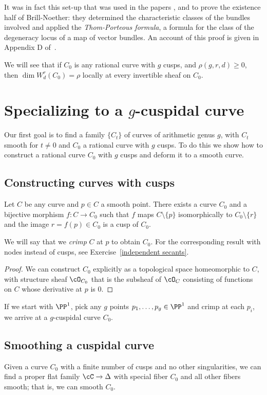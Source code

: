 It was in fact this set-up that was used in the papers \cite{MR323792}, \cite{MR0357398} and \cite{Kempf} to prove the existence half of Brill-Noether: they determined the characteristic classes of the bundles involved and applied the \emph{Thom-Porteous formula}, a formula for the class of the degeneracy locus of a map of vector bundles. An account of this proof is given in Appendix D of~\cite{3264}.

 We will see that if $C_{0}$ is any rational curve
 with $g$ cusps, and $\rho(g,r,d)\geq 0$, then $\dim W^r_d(C_0) = \rho$ locally at every invertible sheaf
 on $C_{0}$.


\section{Specializing to a $g$-cuspidal curve}

Our first goal is to find a family $\{C_t\}$ of curves of arithmetic genus $g$, with $C_t$ smooth for $t \neq 0$ and $C_0$ a rational curve with $g$ cusps. To do this we show how to construct a rational curve $C_0$ with $g$ cusps and deform it to a smooth curve.

\subsection{Constructing curves with cusps}

\begin{proposition}
Let $C$ be any curve and $p \in C$ a smooth point. There exists a curve $C_0$ and a bijective morphism $f : C \to C_0$ such that  $f$ maps $C \setminus \{p\}$ isomorphically to $C_0 \setminus \{r\}$ and the image $r=f(p) \in C_0$ is a cusp of $C_0$.
\end{proposition}

We will say that we \emph{crimp} $C$ at $p$ to obtain $C_{0}$. For the corresponding result with nodes instead of cusps, see Exercise~\ref{independent secants}. 

\begin{proof}
We can construct $C_0$ explicitly as a topological space homeomorphic to $C$, with structure sheaf $\cO_{C_0}$ that is
the subsheaf of $\cO_C$ consisting of functions on $C$ whose derivative at $p$ is 0.
\end{proof}

If we start with $\PP^1$, pick any $g$ points $p_1,\dots, p_g \in \PP^1$ and crimp at each $p_i$, we arrive at a $g$-cuspidal curve $C_0$.


\subsection{Smoothing a cuspidal curve}  Given a curve $C_0$ with a finite number of cusps and no other singularities, we can find a proper flat family $\cC \to \Delta$ with special fiber $C_0$ and all other fibers smooth;
that is, we can smooth $C_0$. 


